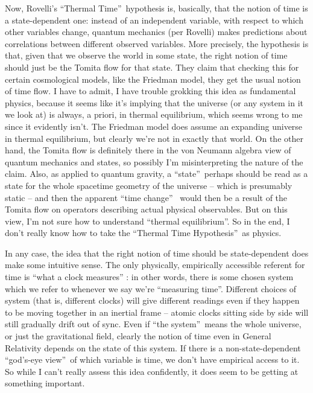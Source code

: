 \documentclass[aps,preprint]{revtex4}%
\begin{document}
Now, Rovelli's \textquotedblleft Thermal Time\textquotedblright\ hypothesis
is, basically, that the notion of time is a state-dependent one: instead of an
independent variable, with respect to which other variables change, quantum
mechanics (per Rovelli) makes predictions about correlations between different
observed variables. More precisely, the hypothesis is that, given that we
observe the world in some state, the right notion of time should just be the
Tomita flow for that state. They claim that checking this for certain
cosmological models, like the Friedman model, they get the usual notion of
time flow. I have to admit, I have trouble grokking this idea as fundamental
physics, because it seems like it's implying that the universe (or any system
in it we look at) is always, a priori, in thermal equilibrium, which seems
wrong to me since it evidently isn't. The Friedman model does assume an
expanding universe in thermal equilibrium, but clearly we're not in exactly
that world. On the other hand, the Tomita flow is definitely there in the von
Neumann algebra view of quantum mechanics and states, so possibly I'm
misinterpreting the nature of the claim. Also, as applied to quantum gravity,
a \textquotedblleft state\textquotedblright\ perhaps should be read as a state
for the whole spacetime geometry of the universe -- which is presumably static
-- and then the apparent \textquotedblleft time change\textquotedblright%
\ would then be a result of the Tomita flow on operators describing actual
physical observables. But on this view, I'm not sure how to understand
\textquotedblleft thermal equilibrium\textquotedblright. So in the end, I
don't really know how to take the \textquotedblleft Thermal Time
Hypothesis\textquotedblright\ as physics.

In any case, the idea that the right notion of time should be state-dependent
does make some intuitive sense. The only physically, empirically accessible
referent for time is \textquotedblleft what a clock measures\textquotedblright%
: in other words, there is some chosen system which we refer to whenever we
say we're \textquotedblleft measuring time\textquotedblright. Different
choices of system (that is, different clocks) will give different readings
even if they happen to be moving together in an inertial frame -- atomic
clocks sitting side by side will still gradually drift out of sync. Even if
\textquotedblleft the system\textquotedblright\ means the whole universe, or
just the gravitational field, clearly the notion of time even in General
Relativity depends on the state of this system. If there is a
non-state-dependent \textquotedblleft god's-eye view\textquotedblright\ of
which variable is time, we don't have empirical access to it. So while I can't
really assess this idea confidently, it does seem to be getting at something important.
\end{document}
